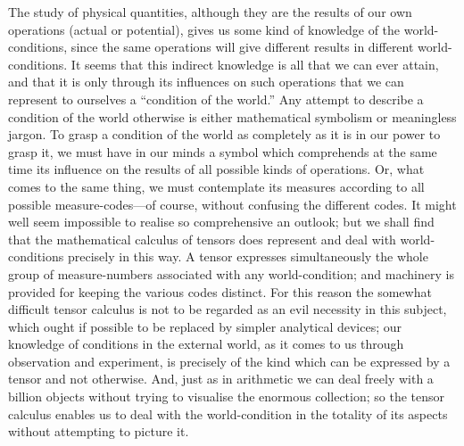 \documentclass[12pt]{book}
\begin{document}
The study of physical quantities, although they are the results of our
%
own operations (actual or potential), gives us some kind of knowledge of the
world\hyp{}conditions, since the same operations will give different results in
different world\hyp{}conditions. It seems that this indirect knowledge is all that
we can ever attain, and that it is only through its influences on such operations
that we can represent to ourselves a ``condition of the world.'' Any
%
attempt to describe a condition of the world otherwise is either mathematical
symbolism or meaningless jargon. To grasp a condition of the world as
completely as it is in our power to grasp it, we must have in our minds a
symbol which comprehends at the same time its influence on the results of
all possible kinds of operations. Or, what comes to the same thing, we must
contemplate its measures according to all possible measure\hyp{}codes---of course,
without confusing the different codes. It might well seem impossible to
realise so comprehensive an outlook; but we shall find that the mathematical
calculus of tensors does represent and deal with world\hyp{}conditions precisely in
this way. A tensor expresses simultaneously the whole group of measure\hyp{}numbers
associated with any world\hyp{}condition; and machinery is provided for
keeping the various codes distinct. For this reason the somewhat difficult
tensor calculus is not to be regarded as an evil necessity in this subject, which
ought if possible to be replaced by simpler analytical devices; our knowledge
of conditions in the external world, as it comes to us through observation and
experiment, is precisely of the kind which can be expressed by a tensor and
not otherwise. And, just as in arithmetic we can deal freely with a billion
objects without trying to visualise the enormous collection; so the tensor
calculus enables us to deal with the world\hyp{}condition in the totality of its
aspects without attempting to picture it.
\end{document}
